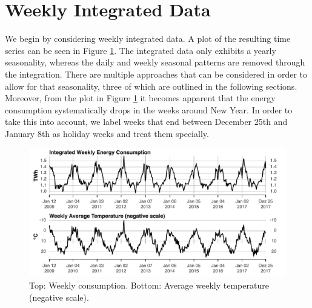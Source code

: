 \documentclass[conference]{IEEEtran}
\begin{document}
\section{Weekly Integrated Data}
We begin by considering weekly integrated data. A plot of the resulting time series can be seen in Figure \ref{weekly}. The integrated data only exhibits a yearly seasonality, whereas the daily and weekly seasonal patterns are removed through the integration. There are multiple approaches that can be considered in order to allow for that seasonality, three of which are outlined in the following sections. Moreover, from the plot in Figure \ref{weekly} it becomes apparent that the energy consumption systematically drops in the weeks around New Year. In order to take this into account, we label weeks that end between December 25th and January 8th as holiday weeks and treat them specially. 

\begin{figure}[ht]
	\centering
	\includegraphics[width=1\textwidth]{Figs/weeklyInt+Temperature.pdf}
	\caption{Top: Weekly consumption. Bottom: Average weekly temperature (negative scale).}
	\label{weekly}
\end{figure}
\end{document}
